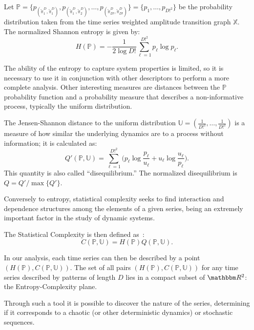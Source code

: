 \documentclass[journal]{IEEEtran}
\begin{document}
Let $\mathbb{P} = \{p_{(\widetilde\pi^D_1, \widetilde\pi^D_1)}, p_{(\widetilde\pi^D_1, \widetilde\pi^D_2)}, \dots, p_{(\widetilde\pi^D_{D!}, \widetilde\pi^D_{D!})} \} = \{p_1,\dots,p_{D!^2}\}$ be the probability distribution taken from the time series weighted amplitude transition graph $\mathbb{X}$.
The normalized Shannon entropy is given by:	
\begin{equation}
H(\mathbb{P}) = -\frac1{2\log D!}\sum_{\ell=1}^{D!^2} p_{\ell} \log p_{\ell} .
\label{eq:Entropia}
\end{equation}

The ability of the entropy to capture system properties is limited, so it is necessary to use it in conjunction with other des\-criptors to perform a more complete analysis.
Other interesting measures are distances between the $\mathbb{P}$ probability function and a probability measure that describes a non-informative process, typically the uniform distribution.

The Jensen-Shannon distance to the uniform distribution $\mathbb{U} = (\frac{1}{D!^2}, \dots, \frac{1}{D!^2})$ is a measure of how similar the underlying dynamics are to a process without information; it is calculated as:
\begin{equation}
Q'(\mathbb{P}, \mathbb{U}) = \sum_{\ell=1}^{D!^2} \Big(p_\ell \log\frac{p_\ell}{u_\ell} +
u_\ell \log\frac{u_\ell}{p_\ell}
\Big).
\end{equation}
This quantity is also called ``disequilibrium.''
The normalized disequilibrium is $ Q=Q'/\max\{Q'\}$.

Conversely to entropy, statistical complexity seeks to find interaction and dependence structures among the elements of a given series, being an extremely important factor in the study of dynamic systems.

The Statistical Complexity is then defined as~\cite{Lamberti2004}:
\begin{equation}
C(\mathbb{P}, \mathbb{U}) = H(\mathbb{P}) Q(\mathbb{P}, \mathbb{U}).
\end{equation}

In our analysis, each time series can then be described by a point $(H(\mathbb{P}), C(\mathbb{P}, \mathbb{U}))$.
The set of all pairs $(H(\mathbb{P}), C(\mathbb{P}, \mathbb{U}))$ for any time series described by patterns of length $D$ lies in a compact subset of $\mathbbm R^2$: the Entropy-Complexity plane. 

Through such a tool it is possible to discover the nature of the series, determining if it corresponds to a chaotic (or other deterministic dynamics) or stochastic sequences.
\end{document}
